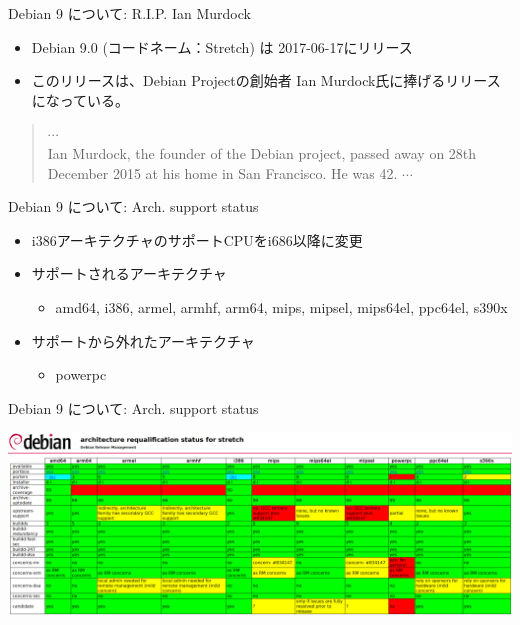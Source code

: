 \documentclass[cjk,c,squeeze,shrink,dvipdfmx,12pt]{beamer}
\begin{document}

\begin{frame}[fragile]{Debian 9 について: R.I.P. Ian Murdock}
  \begin{itemize}
  \item %
    Debian 9.0 (コードネーム：Stretch) は 2017-06-17にリリース
  \item %
    このリリースは、Debian Projectの創始者 Ian Murdock氏に捧げるリリースになっている。
  \end{itemize}
  \begin{quote}
    $\cdots$\\
    Ian Murdock, the founder of the Debian project, passed away on 28th
    December 2015 at his home in San Francisco. He was 42.
    $\cdots$\\
  \end{quote}
\end{frame}


\begin{frame}[fragile]{Debian 9 について: Arch. support status}%

\begin{itemize}
\item i386アーキテクチャのサポートCPUをi686以降に変更
\item サポートされるアーキテクチャ
  \begin{itemize}
  \item
    amd64, i386, armel, armhf, arm64, mips,
    mipsel, {\alert{mips64el}}, ppc64el, s390x
  \end{itemize}
\item サポートから外れたアーキテクチャ
  \begin{itemize}
  \item
    powerpc
  \end{itemize}
\end{itemize}
\end{frame}


\begin{frame}[fragile]{Debian 9 について: Arch. support status}%

  \centering
  \includegraphics[width=1.0\hsize]{image201707/stretch-arch-requalification.png}
\end{frame}
\end{document}
